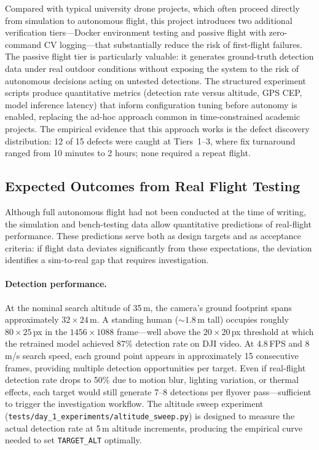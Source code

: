 Compared with typical university drone projects, which often proceed directly from simulation to autonomous flight, this project introduces two additional verification tiers---Docker environment testing and passive flight with zero-command CV logging---that substantially reduce the risk of first-flight failures. The passive flight tier is particularly valuable: it generates ground-truth detection data under real outdoor conditions without exposing the system to the risk of autonomous decisions acting on untested detections. The structured experiment scripts produce quantitative metrics (detection rate versus altitude, GPS CEP, model inference latency) that inform configuration tuning before autonomy is enabled, replacing the ad-hoc approach common in time-constrained academic projects.  The empirical evidence that this approach works is the defect discovery distribution: 12 of 15 defects were caught at Tiers~1--3, where fix turnaround ranged from 10 minutes to 2 hours; none required a repeat flight.

\subsection{Expected Outcomes from Real Flight Testing}\label{sec:expected-outcomes}

Although full autonomous flight had not been conducted at the time of writing, the simulation and bench-testing data allow quantitative predictions of real-flight performance.  These predictions serve both as design targets and as acceptance criteria: if flight data deviates significantly from these expectations, the deviation identifies a sim-to-real gap that requires investigation.

\paragraph{Detection performance.}
At the nominal search altitude of 35\,m, the camera's ground footprint spans approximately $32 \times 24$\,m.  A standing human (${\sim}1.8$\,m tall) occupies roughly $80 \times 25$\,px in the $1456 \times 1088$ frame---well above the $20 \times 20$\,px threshold at which the retrained model achieved 87\% detection rate on DJI video.  At 4.8\,FPS and 8\,m/s search speed, each ground point appears in approximately 15 consecutive frames, providing multiple detection opportunities per target.  Even if real-flight detection rate drops to 50\% due to motion blur, lighting variation, or thermal effects, each target would still generate 7--8 detections per flyover pass---sufficient to trigger the investigation workflow.  The altitude sweep experiment (\texttt{tests/day\_1\_experiments/altitude\_sweep.py}) is designed to measure the actual detection rate at 5\,m altitude increments, producing the empirical curve needed to set \texttt{TARGET\_ALT} optimally.

